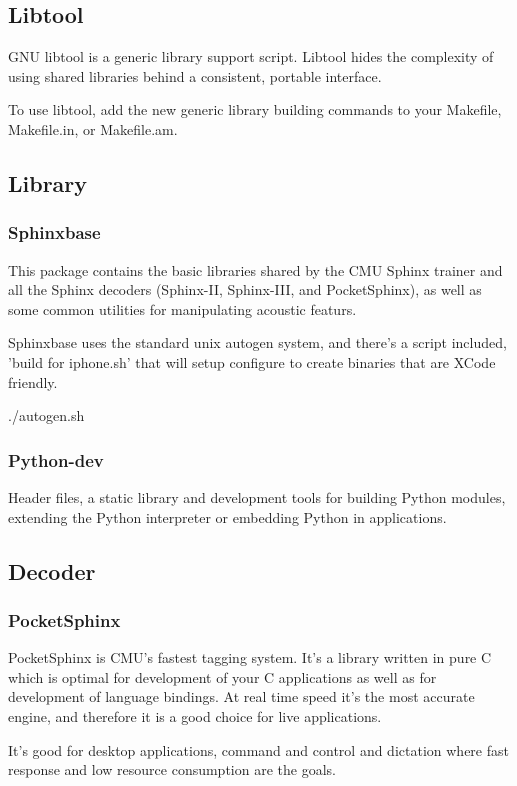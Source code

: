 \documentclass[12pt,a4paper,oneside]{memoir}
\begin{document}
\subsection{Libtool}
 GNU libtool is a generic library support script. Libtool hides the complexity of using shared libraries behind a consistent, portable interface.

To use libtool, add the new generic library building commands to your Makefile, Makefile.in, or Makefile.am.\\

\subsection{Library}
\subsubsection{Sphinxbase}
This package contains the basic libraries shared by the CMU Sphinx
trainer and all the Sphinx decoders (Sphinx-II, Sphinx-III, and
PocketSphinx), as well as some common utilities for manipulating
acoustic featurs.

Sphinxbase uses the standard unix autogen system, and there's a script
included, 'build for iphone.sh' that will setup configure to create
binaries that are XCode friendly.

 ./autogen.sh

\subsubsection{Python-dev}
Header files, a static library and development tools for building
 Python modules, extending the Python interpreter or embedding Python
 in applications.

\subsection{Decoder}
\subsubsection{PocketSphinx}
 PocketSphinx is CMU’s fastest tagging system. It’s a library written in pure C which is optimal for development of your C applications as well as for development of language bindings. At real time speed it’s the most accurate engine, and therefore it is a good choice for live applications.

It's good for desktop applications, command and control and dictation where fast response and low resource consumption are the goals.
\end{document}
